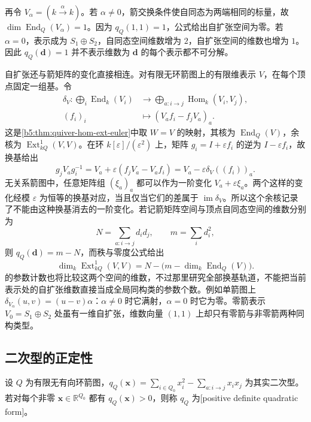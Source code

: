 \ProseParagraphBreak

再令 \(V_\alpha=(k\xrightarrow{\alpha}k)\)。若 \(\alpha\ne0\)，箭交换条件使自同态为两端相同的标量，故 \(\dim\operatorname{End}_Q(V_\alpha)=1\)。因为 \(q_Q(1,1)=1\)，公式给出自扩张空间为零。若 \(\alpha=0\)，表示成为 \(S_1\oplus S_2\)，自同态空间维数增为 \(2\)，自扩张空间的维数也增为 \(1\)。因此 \(q_Q(\mathbf d)=1\) 并不表示维数为 \(\mathbf d\) 的每个表示都不可分解。

\ProseParagraphBreak

自扩张还与箭矩阵的变化直接相连。对有限无环箭图上的有限维表示 \(V\)，在每个顶点固定一组基。令
\[
	\begin{aligned}
		\delta_V:\bigoplus_i\operatorname{End}_k(V_i) &\longrightarrow\bigoplus_{a:i\to j}\operatorname{Hom}_k(V_i,V_j),\\
		(f_i)_i&\longmapsto(V_af_i-f_jV_a)_a.
	\end{aligned}
\]
这是\cref{b5:thm:quiver-hom-ext-euler}中取 \(W=V\) 的映射，其核为 \(\operatorname{End}_Q(V)\)，余核为 \(\operatorname{Ext}^1_{kQ}(V,V)\)。在环 \(k[\varepsilon]/(\varepsilon^2)\) 上，矩阵 \(g_i=I+\varepsilon f_i\) 的逆为 \(I-\varepsilon f_i\)，故换基给出
\[
	g_jV_ag_i^{-1} =V_a+\varepsilon(f_jV_a-V_af_i) =V_a-\varepsilon\delta_V((f_i))_a.
\]
无关系箭图中，任意矩阵组 \((\xi_a)_a\) 都可以作为一阶变化 \(V_a+\varepsilon\xi_a\)。两个这样的变化经模 \(\varepsilon\) 为恒等的换基对应，当且仅当它们的差属于 \(\operatorname{im}\delta_V\)。所以这个余核记录了不能由这种换基消去的一阶变化。若记箭矩阵空间与顶点自同态空间的维数分别为
\[
	N=\sum_{a:i\to j}d_id_j,\qquad m=\sum_i d_i^2,
\]
则 \(q_Q(\mathbf d)=m-N\)，而秩与零度公式给出
\[
	\dim_k\operatorname{Ext}^1_{kQ}(V,V) =N-\bigl(m-\dim_k\operatorname{End}_Q(V)\bigr).
\]
的参数计数也将比较这两个空间的维数，不过那里研究全部换基轨道，不能把当前表示处的自扩张维数直接当成全局同构类的参数个数。例如单箭图上 \(\delta_{V_\alpha}(u,v)=(u-v)\alpha\)：\(\alpha\ne0\) 时它满射，\(\alpha=0\) 时它为零。零箭表示 \(V_0=S_1\oplus S_2\) 处虽有一维自扩张，维数向量 \((1,1)\) 上却只有零箭与非零箭两种同构类型。

\subsection{二次型的正定性}
\label{b5:subsec:1001:03}

\begin{definition}\label{b5:def:positive-quiver-form}
	设 \(Q\) 为有限无有向环箭图，\(q_Q(\mathbf x)=\sum_{i\in Q_0}x_i^2-\sum_{a:i\to j}x_ix_j\) 为其实二次型。若对每个非零 \(\mathbf x\in\mathbb R^{Q_0}\) 都有 \(q_Q(\mathbf x)>0\)，则称 \(q_Q\) 为[positive definite quadratic form]。
\end{definition}


